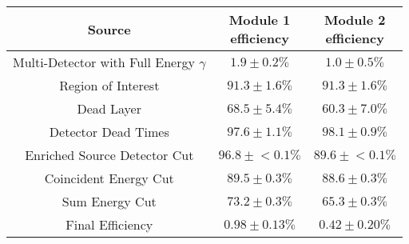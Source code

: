 \begin{tabular}{|c|c|c|}
\hline
  Source & \makecell{Module 1\\efficiency} & \makecell{Module 2\\efficiency} \\
\hline
  \makecell{Multi-Detector with\\Full Energy $\gamma$} & $1.9 \pm 0.2\%$ & $1.0 \pm 0.5\%$ \\
  Region of Interest & $91.3 \pm 1.6\%$ & $91.3 \pm 1.6\%$ \\
  Dead Layer & $68.5 \pm 5.4\%$ & $60.3 \pm 7.0\%$ \\
  Detector Dead Times & $97.6 \pm 1.1\%$ & $98.1 \pm 0.9\%$ \\
  Enriched Source Detector Cut & $96.8 \pm{}<\!0.1\%$ & $89.6 \pm{}<\!0.1\%$ \\
  Coincident Energy Cut & $89.5 \pm 0.3\%$ & $88.6 \pm 0.3\%$ \\
  Sum Energy Cut & $73.2 \pm 0.3\%$ & $65.3 \pm 0.3\%$ \\
  \hline Final Efficiency & $0.98 \pm 0.13\%$ & $0.42 \pm 0.20\%$ \\
\hline
\end{tabular}
